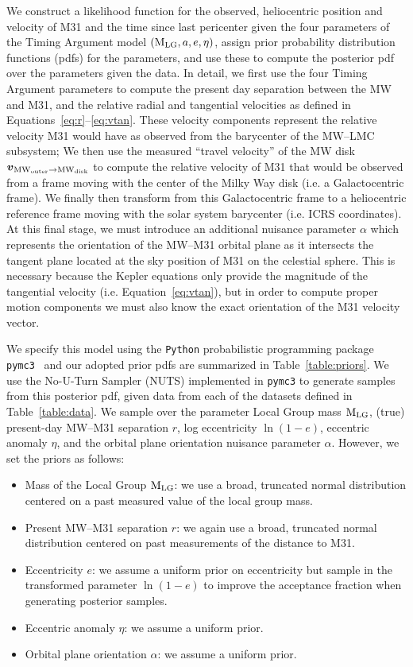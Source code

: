 \documentclass[twocolumn]{aastex631}
\newcommand{\mlg}{\ensuremath{\textrm{M}_{\rm LG}}}
\newcommand{\bov}{\ensuremath{\boldsymbol{v}}}
\newcommand{\vel}[2]{\ensuremath{\bov_{\rm #1 \to #2}}}
\newcommand{\mwouter}{\ensuremath{\textrm{MW}_\textrm{outer}}}
\newcommand{\mwdisk}{\ensuremath{\textrm{MW}_\textrm{disk}}}
\begin{document}
We construct a likelihood function for the observed, heliocentric position and
velocity of M31 and the time since last pericenter given the four parameters of
the Timing Argument model $(\mlg, a, e, \eta)$, assign prior probability
distribution functions (pdfs) for the parameters, and use these to compute the
posterior pdf over the parameters given the data.
In detail, we first use the four Timing Argument parameters to compute the
present day separation between the MW and M31, and the relative radial and
tangential velocities as defined in Equations~\ref{eq:r}--\ref{eq:vtan}.
These velocity components represent the relative velocity M31 would have as
observed from the barycenter of the MW--LMC subsystem; We then use the measured
``travel velocity'' of the MW disk $\vel{\mwouter}{\mwdisk}$ to compute the
relative velocity of M31 that would be observed from a frame moving with the
center of the Milky Way disk (i.e. a Galactocentric frame).
We finally then transform from this Galactocentric frame to a heliocentric
reference frame moving with the solar system barycenter (i.e. ICRS coordinates).
At this final stage, we must introduce an additional nuisance parameter $\alpha$
which represents the orientation of the MW--M31 orbital plane as it intersects
the tangent plane located at the sky position of M31 on the celestial sphere.
This is necessary because the Kepler equations only provide the magnitude of the
tangential velocity (i.e. Equation~\ref{eq:vtan}), but in order to compute
proper motion components we must also know the exact orientation of the M31
velocity vector.

We specify this model using the \texttt{Python} probabilistic programming
package \texttt{pymc3}~\citep{Salvatier2016} and our adopted prior pdfs are
summarized in Table~\ref{table:priors}.
We use the No-U-Turn Sampler (NUTS) \citep{gelman?} implemented in
\texttt{pymc3} to generate samples from this posterior pdf, given data from each
of the datasets defined in Table~\ref{table:data}.
We sample over the parameter Local Group mass $\mlg$, (true) present-day MW--M31
separation $r$, log eccentricity $\ln\left(1 - e\right)$, eccentric anomaly
$\eta$, and the orbital plane orientation nuisance parameter $\alpha$.
However, we set the priors as follows:
\begin{itemize}
  \item Mass of the Local Group $\mlg$: we use a broad, truncated normal
  distribution centered on a past measured value of the local group mass.
  \item Present MW--M31 separation $r$: we again use a broad, truncated normal
  distribution centered on past measurements of the distance to M31.
  \item Eccentricity $e$: we assume a uniform prior on eccentricity but sample
  in the transformed parameter $\ln(1-e)$ to improve the acceptance fraction
  when generating posterior samples.
  \item Eccentric anomaly $\eta$: we assume a uniform prior.
  \item Orbital plane orientation $\alpha$: we assume a uniform prior.
\end{itemize}
\end{document}
